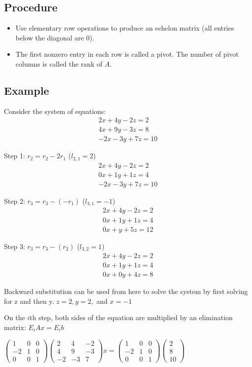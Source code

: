 \documentclass[12pt]{article}
\begin{document}
\subsection{Procedure}
\begin{itemize}
\item Use elementary row operations to produce an echelon matrix (all entries below the diagonal are 0).
\item The first nonzero entry in each row is called a pivot. The number of pivot columns is called the rank of $A$.
\end{itemize}

\subsection{Example}
Consider the system of equations:
\begin{align*}
2x + 4y - 2z = 2\\
4x + 9y - 3z = 8\\
-2x - 3y + 7z = 10
\end{align*}

Step 1: $r_2 = r_2 - 2r_1$ ($l_{2,1} = 2$)
\begin{align*}
2x + 4y - 2z = 2\\
0x + 1y + 1z = 4\\
-2x - 3y + 7z = 10
\end{align*}

Step 2: $r_3 = r_3 - (-r_1)$ ($l_{3,1} = -1$)
\begin{align*}
2x + 4y - 2z = 2\\
0x + 1y + 1z = 4\\
0x + y + 5z = 12
\end{align*}

Step 3: $r_3 = r_3 - (r_2)$ ($l_{3,2} = 1$)
\begin{align*}
2x + 4y - 2z = 2\\
0x + 1y + 1z = 4\\
0x + 0y + 4z = 8
\end{align*}

Backward substitution can be used from here to solve the system by first solving for z and then y.
$z = 2, y = 2,$ and $x = -1$

On the $i$th step, both sides of the equation are multiplied by an elimination matrix:
$E_i Ax = E_i b$

$
\begin{pmatrix}
1&0&0\\
-2&1&0\\
0&0&1 
\end{pmatrix}
\begin{pmatrix}
2&4&-2\\
4&9&-3\\
-2&-3&7
\end{pmatrix}
x = 
\begin{pmatrix}
1&0&0\\
-2&1&0\\
0&0&1 
\end{pmatrix}
\begin{pmatrix}
2\\
8\\
10
\end{pmatrix}
$
\end{document}
